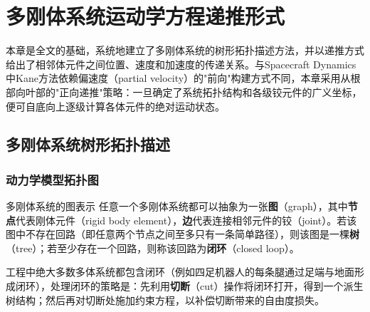 \documentclass[10pt,a4paper]{book}
\theoremstyle{thmstyle}
\theoremstyle{defstyle}
\theoremstyle{prostyle}
\begin{document}
\begin{titlepage}
\end{titlepage}

\tableofcontents
\newpage

\chapter{多刚体系统运动学方程递推形式}

本章是全文的基础，系统地建立了多刚体系统的树形拓扑描述方法，并以递推方式给出了相邻体元件之间位置、速度和加速度的传递关系。与Spacecraft Dynamics中Kane方法依赖偏速度（partial velocity）的"前向"构建方式不同，本章采用从根部向叶部的"正向递推"策略：一旦确定了系统拓扑结构和各级铰元件的广义坐标，便可自底向上逐级计算各体元件的绝对运动状态。

\section{多刚体系统树形拓扑描述}

\subsection{动力学模型拓扑图}

\begin{mydefinition}{多刚体系统的图表示}
任意一个多刚体系统都可以抽象为一张\textbf{图}（graph），其中\textbf{节点}代表刚体元件（rigid body element），\textbf{边}代表连接相邻元件的铰（joint）。若该图中不存在回路（即任意两个节点之间至多只有一条简单路径），则该图是一棵\textbf{树}（tree）；若至少存在一个回路，则称该回路为\textbf{闭环}（closed loop）。

工程中绝大多数多体系统都包含闭环（例如四足机器人的每条腿通过足端与地面形成闭环），处理闭环的策略是：先利用\textbf{切断}（cut）操作将闭环打开，得到一个派生树结构；然后再对切断处施加约束方程，以补偿切断带来的自由度损失。
\end{mydefinition}
\end{document}
